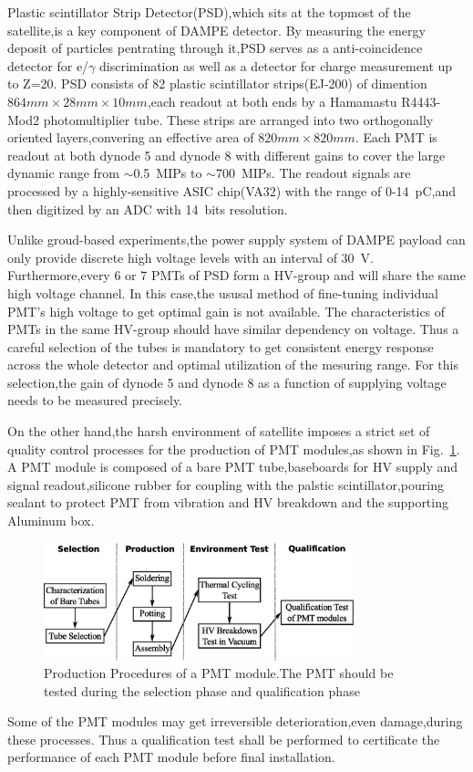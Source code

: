 \documentclass[preprint,5p,times]{elsarticle}
\begin{document}
Plastic scintillator Strip Detector(PSD),which sits at the topmost of the satellite,is a key component of DAMPE detector.
By measuring the energy deposit of particles pentrating through it,PSD serves as a anti-coincidence detector for e/$\gamma$ discrimination as well as a detector for charge measurement up to Z=20.
PSD consists of 82 plastic scintillator strips(EJ-200\cite{ej200}) of dimention $864mm\times28mm\times10mm$,each readout at both ends by a Hamamastu R4443-Mod2 photomultiplier tube.
These strips are arranged into two orthogonally oriented layers,convering an effective area of $820mm\times820mm$.
Each PMT is readout at both dynode 5 and dynode 8 with different gains to cover the large dynamic range from $\sim$0.5~MIPs to $\sim$700~MIPs.
The readout signals are processed by a highly-sensitive ASIC chip(VA32) with the range of 0-14~pC,and then digitized by an ADC with 14~bits resolution.

Unlike groud-based experiments,the power supply system of DAMPE payload can only provide discrete high voltage levels with an interval of 30~V.
Furthermore,every 6 or 7 PMTs of PSD form a HV-group and will share the same high voltage channel.
In this case,the ususal method of fine-tuning individual PMT's high voltage to get optimal gain is not available.  
The characteristics of PMTs in the same HV-group should have similar dependency on voltage.
Thus a careful selection of the tubes is mandatory to get consistent energy response across the whole detector and optimal utilization of the mesuring range.
For this selection,the gain of dynode 5 and dynode 8 as a function of supplying voltage needs to be measured precisely.  

On the other hand,the harsh environment of satellite imposes a strict set of quality control processes for the production of PMT modules,as shown in Fig.~\ref{fig:production_procedure}.
A PMT module is composed of a bare PMT tube,baseboards for HV supply and signal readout,silicone rubber for coupling with the palstic scintillator,pouring sealant to protect PMT from vibration and HV breakdown and the supporting Aluminum box.
\begin{figure}[h!]
 \centering
 \includegraphics[width=90mm]{pmt_production_procedure}
\caption{Production Procedures of a PMT module.The PMT should be tested during the selection phase and qualification phase}
\label{fig:production_procedure}
\end{figure} 
Some of the PMT modules may get irreversible deterioration,even damage,during these processes.
Thus a qualification test shall be performed to certificate the performance of each PMT module before final installation. 
\end{document}
